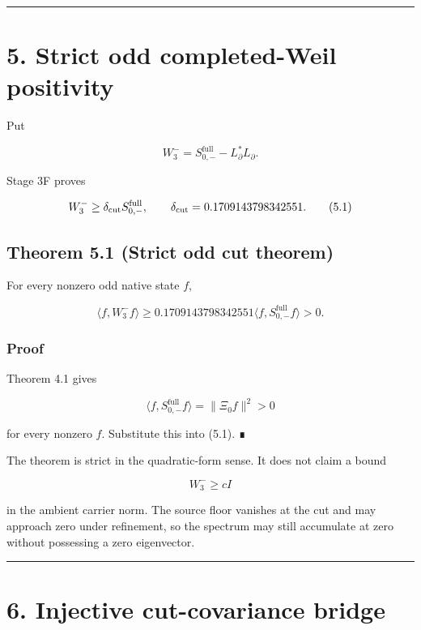 \begin{center}\rule{0.5\linewidth}{0.5pt}\end{center}

\hypertarget{strict-odd-completed-weil-positivity}{%
\section{5. Strict odd completed-Weil positivity}\label{strict-odd-completed-weil-positivity}}

Put

\[
W_3^-
=
S_{0,-}^{\mathrm{full}}-L_\partial^*L_\partial.
\]

Stage 3F proves

\[
W_3^-
\ge
\delta_{\rm cut}S_{0,-}^{\mathrm{full}},
\qquad
\delta_{\rm cut}
=0.1709143798342551.
\tag{5.1}
\]

\hypertarget{theorem-5.1-strict-odd-cut-theorem}{%
\subsection{Theorem 5.1 (Strict odd cut theorem)}\label{theorem-5.1-strict-odd-cut-theorem}}

For every nonzero odd native state \(f\),

\[
\boxed{
\langle f,W_3^-f\rangle
\ge
0.1709143798342551
\langle f,S_{0,-}^{\mathrm{full}}f\rangle
>0.
}
\tag{5.2}
\]

\hypertarget{proof-3}{%
\subsubsection{Proof}\label{proof-3}}

Theorem 4.1 gives

\[
\langle f,S_{0,-}^{\mathrm{full}}f\rangle
=\|\Xi_0f\|^2>0
\]

for every nonzero \(f\). Substitute this into (5.1). ∎

The theorem is strict in the quadratic-form sense. It does not claim a bound

\[
W_3^-\ge cI
\]

in the ambient carrier norm. The source floor vanishes at the cut and may
approach zero under refinement, so the spectrum may still accumulate at zero
without possessing a zero eigenvector.

\begin{center}\rule{0.5\linewidth}{0.5pt}\end{center}

\hypertarget{injective-cut-covariance-bridge}{%
\section{6. Injective cut-covariance bridge}\label{injective-cut-covariance-bridge}}


